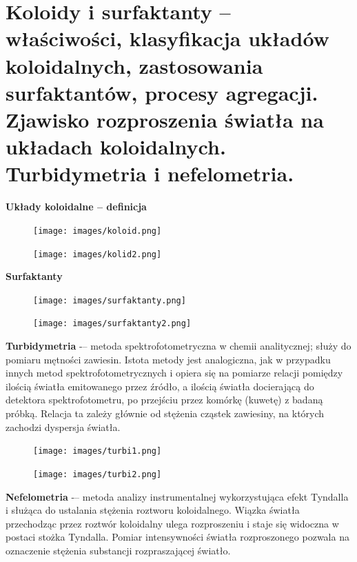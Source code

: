 \documentclass{article}
\begin{document}
\section{Koloidy i surfaktanty -- właściwości, klasyfikacja układów koloidalnych, zastosowania surfaktantów, procesy agregacji. Zjawisko rozproszenia światła na układach koloidalnych. Turbidymetria i nefelometria.}
\begin{center}
    \textbf{Układy koloidalne -- definicja}
\end{center}
\vspace{-0.7cm}
\begin{figure}[H]
    \centering
    \texttt{[image: images/koloid.png]}
\end{figure}

\begin{figure}[H]
    \centering
    \texttt{[image: images/kolid2.png]}
\end{figure}

\newpage
\begin{center}
    \textbf{Surfaktanty}
\end{center}
\vspace{-0.7cm}
\begin{figure}[H]
    \centering
    \texttt{[image: images/surfaktanty.png]}
\end{figure}

\begin{figure}[H]
    \centering
    \texttt{[image: images/surfaktanty2.png]}
\end{figure}

\textbf{Turbidymetria} -– metoda spektrofotometryczna w chemii analitycznej; służy do pomiaru mętności zawiesin. Istota metody jest analogiczna, jak w przypadku innych metod spektrofotometrycznych i opiera się na pomiarze relacji pomiędzy ilością światła emitowanego przez źródło, a ilością światła docierającą do detektora spektrofotometru, po przejściu przez komórkę (kuwetę) z badaną próbką. Relacja ta zależy głównie od stężenia cząstek zawiesiny, na których zachodzi dyspersja światła.

\begin{figure}[H]
    \centering
    \texttt{[image: images/turbi1.png]}
\end{figure}

\begin{figure}[H]
    \centering
    \texttt{[image: images/turbi2.png]}
\end{figure}

\textbf{Nefelometria} -– metoda analizy instrumentalnej wykorzystująca efekt Tyndalla i służąca do ustalania stężenia roztworu koloidalnego. Wiązka światła przechodząc przez roztwór koloidalny ulega rozproszeniu i staje się widoczna w postaci stożka Tyndalla. Pomiar intensywności światła rozproszonego pozwala na oznaczenie stężenia substancji rozpraszającej światło.
\end{document}
